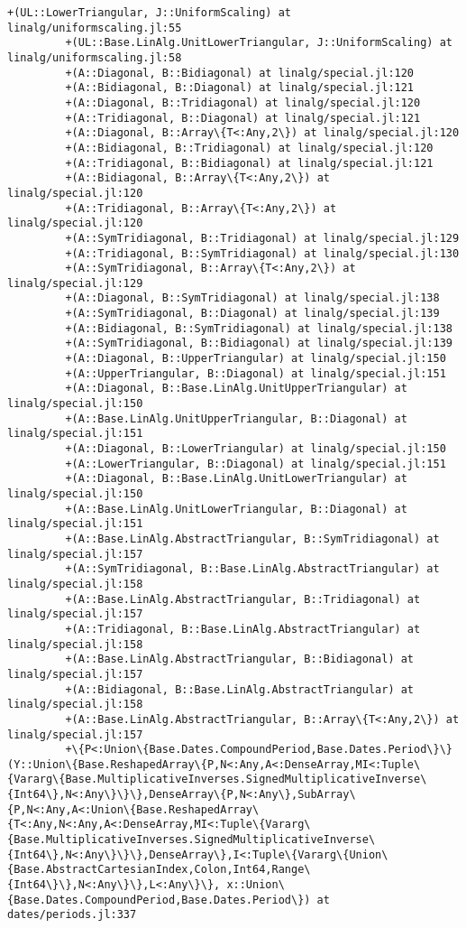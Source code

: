 \documentclass[11pt]{article}
\begin{document}
\begin{Verbatim}[commandchars=\\\{\}]
         +(UL::LowerTriangular, J::UniformScaling) at linalg/uniformscaling.jl:55
         +(UL::Base.LinAlg.UnitLowerTriangular, J::UniformScaling) at linalg/uniformscaling.jl:58
         +(A::Diagonal, B::Bidiagonal) at linalg/special.jl:120
         +(A::Bidiagonal, B::Diagonal) at linalg/special.jl:121
         +(A::Diagonal, B::Tridiagonal) at linalg/special.jl:120
         +(A::Tridiagonal, B::Diagonal) at linalg/special.jl:121
         +(A::Diagonal, B::Array\{T<:Any,2\}) at linalg/special.jl:120
         +(A::Bidiagonal, B::Tridiagonal) at linalg/special.jl:120
         +(A::Tridiagonal, B::Bidiagonal) at linalg/special.jl:121
         +(A::Bidiagonal, B::Array\{T<:Any,2\}) at linalg/special.jl:120
         +(A::Tridiagonal, B::Array\{T<:Any,2\}) at linalg/special.jl:120
         +(A::SymTridiagonal, B::Tridiagonal) at linalg/special.jl:129
         +(A::Tridiagonal, B::SymTridiagonal) at linalg/special.jl:130
         +(A::SymTridiagonal, B::Array\{T<:Any,2\}) at linalg/special.jl:129
         +(A::Diagonal, B::SymTridiagonal) at linalg/special.jl:138
         +(A::SymTridiagonal, B::Diagonal) at linalg/special.jl:139
         +(A::Bidiagonal, B::SymTridiagonal) at linalg/special.jl:138
         +(A::SymTridiagonal, B::Bidiagonal) at linalg/special.jl:139
         +(A::Diagonal, B::UpperTriangular) at linalg/special.jl:150
         +(A::UpperTriangular, B::Diagonal) at linalg/special.jl:151
         +(A::Diagonal, B::Base.LinAlg.UnitUpperTriangular) at linalg/special.jl:150
         +(A::Base.LinAlg.UnitUpperTriangular, B::Diagonal) at linalg/special.jl:151
         +(A::Diagonal, B::LowerTriangular) at linalg/special.jl:150
         +(A::LowerTriangular, B::Diagonal) at linalg/special.jl:151
         +(A::Diagonal, B::Base.LinAlg.UnitLowerTriangular) at linalg/special.jl:150
         +(A::Base.LinAlg.UnitLowerTriangular, B::Diagonal) at linalg/special.jl:151
         +(A::Base.LinAlg.AbstractTriangular, B::SymTridiagonal) at linalg/special.jl:157
         +(A::SymTridiagonal, B::Base.LinAlg.AbstractTriangular) at linalg/special.jl:158
         +(A::Base.LinAlg.AbstractTriangular, B::Tridiagonal) at linalg/special.jl:157
         +(A::Tridiagonal, B::Base.LinAlg.AbstractTriangular) at linalg/special.jl:158
         +(A::Base.LinAlg.AbstractTriangular, B::Bidiagonal) at linalg/special.jl:157
         +(A::Bidiagonal, B::Base.LinAlg.AbstractTriangular) at linalg/special.jl:158
         +(A::Base.LinAlg.AbstractTriangular, B::Array\{T<:Any,2\}) at linalg/special.jl:157
         +\{P<:Union\{Base.Dates.CompoundPeriod,Base.Dates.Period\}\}(Y::Union\{Base.ReshapedArray\{P,N<:Any,A<:DenseArray,MI<:Tuple\{Vararg\{Base.MultiplicativeInverses.SignedMultiplicativeInverse\{Int64\},N<:Any\}\}\},DenseArray\{P,N<:Any\},SubArray\{P,N<:Any,A<:Union\{Base.ReshapedArray\{T<:Any,N<:Any,A<:DenseArray,MI<:Tuple\{Vararg\{Base.MultiplicativeInverses.SignedMultiplicativeInverse\{Int64\},N<:Any\}\}\},DenseArray\},I<:Tuple\{Vararg\{Union\{Base.AbstractCartesianIndex,Colon,Int64,Range\{Int64\}\},N<:Any\}\},L<:Any\}\}, x::Union\{Base.Dates.CompoundPeriod,Base.Dates.Period\}) at dates/periods.jl:337

\end{Verbatim}
\end{document}
